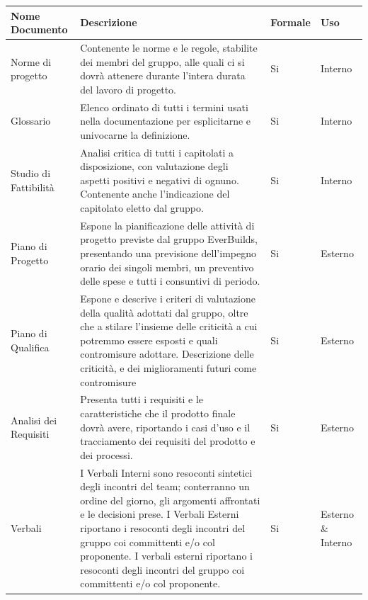 			\begin{center}
				\begin{longtable}{|p{3.5cm}|p{5cm}|p{2cm}|p{3cm}|}
					\hline
					\rowcolor{lighter-grayer}
					\textbf{Nome Documento} & \textbf{Descrizione} & \textbf{Formale} & \textbf{Uso}\\
					\hline
					\endfirsthead
					Norme di progetto & Contenente le norme e le regole, stabilite dei membri del gruppo, alle quali ci si dovrà attenere durante l’intera durata del lavoro di progetto. & Si & Interno \\
					\hline
					Glossario & Elenco ordinato di tutti i termini usati nella documentazione per esplicitarne e univocarne la definizione. & Si & Interno \\
					\hline
					Studio di Fattibilità & Analisi critica di tutti i capitolati a disposizione, con valutazione degli aspetti positivi e negativi di ognuno. Contenente anche l’indicazione del capitolato eletto dal gruppo. & Si & Interno \\
					\hline
					Piano di Progetto & Espone la pianificazione delle attività di progetto previste dal gruppo EverBuilds, presentando una previsione dell’impegno orario dei singoli membri, un preventivo delle spese e tutti i consuntivi di periodo. & Si & Esterno \\
					\hline
					Piano di Qualifica & Espone e descrive i criteri di valutazione della qualità adottati dal gruppo, oltre che a stilare l’insieme delle criticità a cui potremmo essere esposti e quali contromisure adottare. \newline Descrizione delle criticità, e dei miglioramenti futuri come contromisure & Si & Esterno \\
					\hline
					Analisi dei Requisiti & Presenta tutti i requisiti e le caratteristiche che il prodotto finale dovrà avere, riportando i casi d’uso e il tracciamento dei requisiti del prodotto e dei processi. & Si & Esterno \\
					\hline
					Verbali & I Verbali Interni sono resoconti sintetici degli incontri del team; conterranno un ordine del giorno, gli argomenti affrontati e le decisioni prese. I Verbali Esterni riportano i resoconti degli incontri del gruppo coi committenti e/o col proponente. \newline I verbali esterni riportano i resoconti degli incontri del gruppo coi committenti e/o col proponente. & Si & Esterno \& Interno  \\
					\hline
				\end{longtable}
			\end{center}

